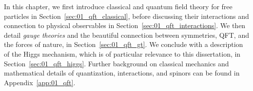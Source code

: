In this chapter, we first introduce classical and quantum field theory for free particles in Section~\ref{sec:01_qft_classical}, before discussing their interactions and connection to physical observables in Section~\ref{sec:01_qft_interactions}.
We then detail \textit{gauge theories} and the beautiful connection between symmetries, QFT, and the forces of nature, in Section~\ref{sec:01_qft_gt}.
We conclude with a description of the Higgs mechanism, which is of particular relevance to this dissertation, in Section~\ref{sec:01_qft_higgs}.
Further background on classical mechanics and mathematical details of quantization, interactions, and spinors can be found in Appendix~\ref{app:01_qft}.












